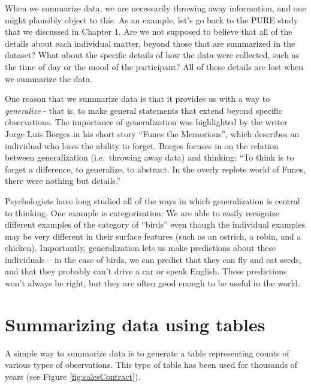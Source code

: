 \documentclass[12pt,]{book}
\theoremstyle{definition}
\theoremstyle{definition}
\theoremstyle{definition}
\theoremstyle{remark}
\begin{document}
When we summarize data, we are necessarily throwing away information, and one might plausibly object to this. As an example, let's go back to the PURE study that we discussed in Chapter 1. Are we not supposed to believe that all of the details about each individual matter, beyond those that are summarized in the dataset? What about the specific details of how the data were collected, such as the time of day or the mood of the participant? All of these details are lost when we summarize the data.

One reason that we summarize data is that it provides us with a way to \emph{generalize} - that is, to make general statements that extend beyond specific observations. The importance of generalization was highlighted by the writer Jorge Luis Borges in his short story ``Funes the Memorious'', which describes an individual who loses the ability to forget. Borges focuses in on the relation between generalization (i.e.~throwing away data) and thinking: ``To think is to forget a difference, to generalize, to abstract. In the overly replete world of Funes, there were nothing but details.''

Psychologists have long studied all of the ways in which generalization is central to thinking. One example is categorization: We are able to easily recognize different examples of the category of ``birds'' even though the individual examples may be very different in their surface features (such as an ostrich, a robin, and a chicken). Importantly, generalization lets us make predictions about these individuals -- in the case of birds, we can predict that they can fly and eat seeds, and that they probably can't drive a car or speak English. These predictions won't always be right, but they are often good enough to be useful in the world.

\hypertarget{summarizing-data-using-tables}{%
\section{Summarizing data using tables}\label{summarizing-data-using-tables}}

A simple way to summarize data is to generate a table representing counts of various types of observations. This type of table has been used for thousands of years (see Figure \ref{fig:salesContract}).
\end{document}
